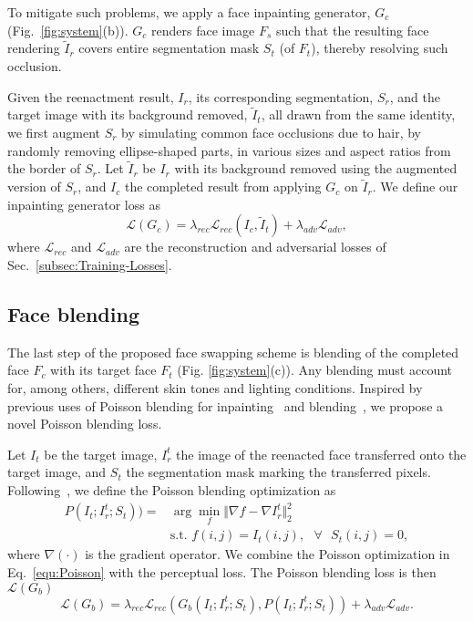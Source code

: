 To mitigate such problems, we apply a face inpainting generator, $G_{c}$ (Fig.~\ref{fig:system}(b)). $G_{c}$ renders face image $F_{s}$ such that the resulting face rendering $\tilde{I}_{r}$ covers entire segmentation mask $S_{t}$ (of $F_{t}$), thereby resolving such occlusion.

Given the reenactment result, $I_r$, its corresponding segmentation, $S_r$, and the target image with its background removed, $\tilde{I}_t$, all drawn from the same identity, we first augment $S_r$ by simulating common face occlusions due to hair, by randomly removing ellipse-shaped parts, in various sizes and aspect ratios from the border of $S_r$. Let $\tilde{I}_r$ be $I_r$ with its background removed using the augmented version of $S_r$, and $I_c$ the completed result from applying $G_c$ on $\tilde{I}_r$. We define our inpainting generator loss as
\begin{equation}
\mathcal{L}(G_{c})=\lambda _{rec}\mathcal{L}_{rec}(I_c,\tilde{I}_t)+\lambda _{adv}\mathcal{L}_{adv},
\end{equation}%
where $\mathcal{L}_{rec}$ and $\mathcal{L}_{adv}$ are the reconstruction and adversarial losses of Sec.~\ref{subsec:Training-Losses}.

\subsection{Face blending}
\label{subsec:Blending}
The last step of the proposed face swapping scheme is blending of the completed face $F_c$ with its target face $F_{t}$ (Fig. \ref{fig:system}(c)). Any blending must account for, among others, different skin tones and lighting conditions. Inspired by previous uses of Poisson blending for inpainting~\cite{yeh2017semantic} and blending~\cite{wu2017gp}, we propose a novel Poisson blending loss.

Let $I_{t}$ be the target image, $I_{r}^{t}$ the image of the reenacted face transferred onto the target image, and $S_{t}$ the segmentation mask marking the transferred pixels. Following~\cite{perez2003poisson}, we define the Poisson blending optimization as
\begin{equation}
\label{equ:Poisson}
   \begin{alignedat}{2}
    P(I_{t};I_{r}^{t};S_{t}))= & \arg \min_{f}\Vert \nabla f-\nabla I_{r}^{t}\Vert _{2}^{2} \\
    & \text{s.t. }f(i,j)=I_{t}(i,j),\text{ }\forall \text{ }S_{t}(i,j)=0,
   \end{alignedat}
\end{equation}
where $\nabla \left( \cdot \right) $ is the gradient operator. We combine the Poisson optimization in Eq.~\eqref{equ:Poisson} with the perceptual loss. The Poisson blending loss is then $\mathcal{L}(G_{b})$
$$
\mathcal{L}(G_{b})=\lambda _{rec}\mathcal{L}_{rec}(G_{b}(I_{t};I_{r}^{t};S_{t}),P(I_{t};I_{r}^{t};S_{t}))+\lambda_{adv}\mathcal{L}%
_{adv}.
$$

